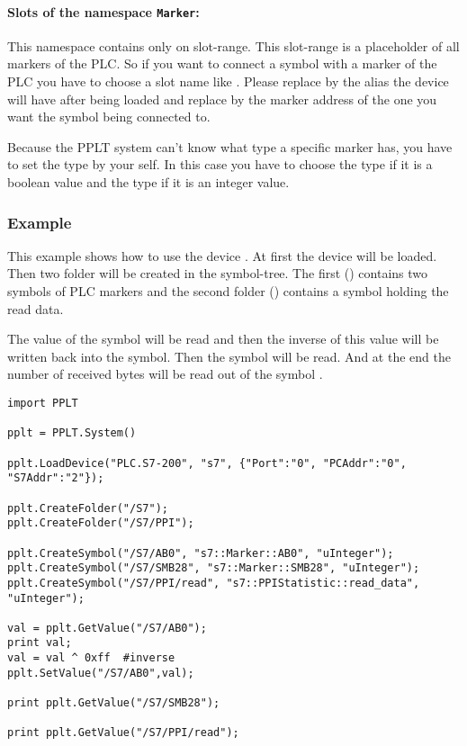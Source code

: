 \paragraph{Slots of the namespace \texttt{Marker}:}
This namespace contains only on slot-range. This slot-range is a placeholder of
all markers of the PLC. So if you want to connect a symbol with a marker of 
the PLC you have to choose a slot name like 
. Please replace  by the alias 
the device will have after being loaded and replace  by the 
marker address of the one you want the symbol being connected to.

Because the PPLT system can't know what type a specific marker has, you have 
to set the type by your self. In this case you have to choose the type 
 if it is a boolean value and the type  if it is an 
integer value.


\subsubsection{Example}
This example shows how to use the device . At first the 
device will be loaded. Then two folder will be created in the symbol-tree. The 
first () contains two symbols of PLC markers and the second folder
() contains a symbol holding the read data.

The value of the symbol  will be read and then the inverse of 
this value will be written back into the symbol. Then the symbol 
 will be read. And at the end the number of received bytes 
will be read out of the symbol .
\begin{verbatim}
import PPLT

pplt = PPLT.System()

pplt.LoadDevice("PLC.S7-200", "s7", {"Port":"0", "PCAddr":"0", "S7Addr":"2"});

pplt.CreateFolder("/S7");
pplt.CreateFolder("/S7/PPI");

pplt.CreateSymbol("/S7/AB0", "s7::Marker::AB0", "uInteger");
pplt.CreateSymbol("/S7/SMB28", "s7::Marker::SMB28", "uInteger");
pplt.CreateSymbol("/S7/PPI/read", "s7::PPIStatistic::read_data", "uInteger");

val = pplt.GetValue("/S7/AB0");
print val;
val = val ^ 0xff  #inverse
pplt.SetValue("/S7/AB0",val);

print pplt.GetValue("/S7/SMB28");

print pplt.GetValue("/S7/PPI/read");
\end{verbatim}




